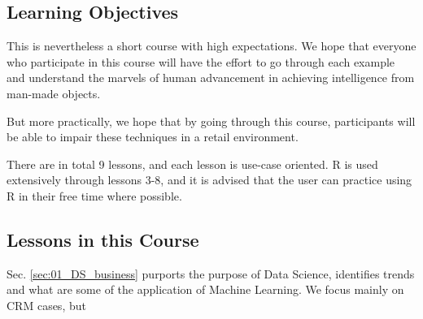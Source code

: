\subsection{Learning Objectives}

This is nevertheless a short course with high expectations.  We hope that everyone who participate in this course will have the effort to go through each example and understand the marvels of human advancement in achieving intelligence from man-made objects.  

But more practically, we hope that by going through this course, participants will be able to impair these techniques in a retail environment.  

There are in total 9 lessons, and each lesson is use-case oriented.  R is used extensively through lessons 3-8, and it is advised that the user can practice using R in their free time where possible.  

\subsection{Lessons in this Course}

Sec. \ref{sec:01_DS_business} purports the purpose of Data Science, identifies trends and what are some of the application of Machine Learning.  We focus mainly on CRM cases, but 

\newpage